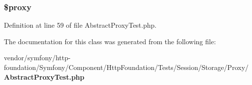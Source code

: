 \subsubsection[{\$proxy}]{\setlength{\rightskip}{0pt plus 5cm}\$proxy\hspace{0.3cm}{\ttfamily [protected]}}\label{class_symfony_1_1_component_1_1_http_foundation_1_1_tests_1_1_session_1_1_storage_1_1_proxy_1_1_abstract_proxy_test_a01564a63e754b8037a987f7f8fde0e6d}


Definition at line 59 of file Abstract\+Proxy\+Test.\+php.



The documentation for this class was generated from the following file\+:\begin{DoxyCompactItemize}
\item 
vendor/symfony/http-\/foundation/\+Symfony/\+Component/\+Http\+Foundation/\+Tests/\+Session/\+Storage/\+Proxy/{\bf Abstract\+Proxy\+Test.\+php}\end{DoxyCompactItemize}
